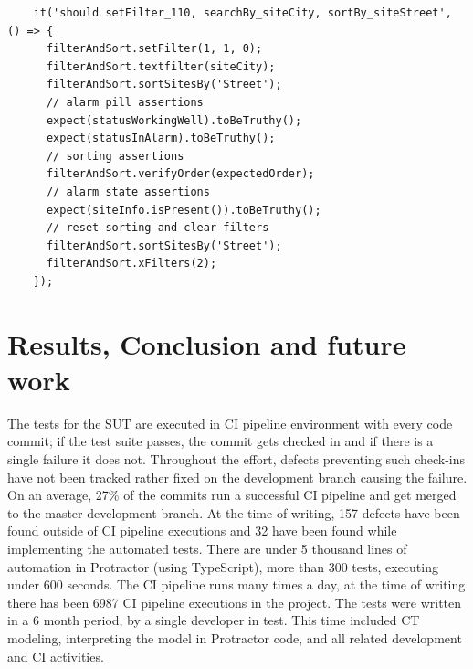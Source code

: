 \documentclass[conference]{IEEEtran}
\begin{document}
	\begin{lstlisting}
    it('should setFilter_110, searchBy_siteCity, sortBy_siteStreet', () => {
      filterAndSort.setFilter(1, 1, 0);
      filterAndSort.textfilter(siteCity);
      filterAndSort.sortSitesBy('Street');
      // alarm pill assertions
      expect(statusWorkingWell).toBeTruthy();
      expect(statusInAlarm).toBeTruthy(); 
      // sorting assertions
      filterAndSort.verifyOrder(expectedOrder);
      // alarm state assertions
      expect(siteInfo.isPresent()).toBeTruthy();
      // reset sorting and clear filters
      filterAndSort.sortSitesBy('Street');
      filterAndSort.xFilters(2);
    });
	\end{lstlisting}


\section{Results, Conclusion and future work}
The tests for the SUT are executed in CI pipeline environment with every code commit; if the test suite passes, the commit gets checked in and if there is a single failure it does not.
Throughout the effort, defects preventing such check-ins have not been tracked rather fixed on the development branch causing the failure.
On an average, 27\% of the commits run a successful CI pipeline and get merged to the master development branch.
At the time of writing, 157 defects have been found outside of CI pipeline executions and 32 have been found while implementing the automated tests.
There are under 5 thousand lines of automation in Protractor (using TypeScript), more than 300 tests, executing under 600 seconds.
The CI pipeline runs many times a day, at the time of writing there has been 6987 CI pipeline executions in the project.
The tests were written in a 6 month period, by a single developer in test. 
This time included CT modeling, interpreting the model in Protractor code, and all related development and CI activities.
\end{document}
